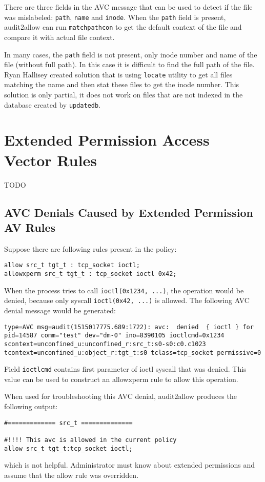 There are three fields in the AVC message that can be used to detect if the file
was mislabeled: \texttt{path}, \texttt{name} and \texttt{inode}. When the
\texttt{path} field is present, audit2allow can run \texttt{matchpathcon} to get
the default context of the file and compare it with actual file context.

In many cases, the \texttt{path} field is not present, only inode number and
name of the file (without full path). In this case it is difficult to find the
full path of the file. Ryan Hallisey created solution \cite{restoreconpullreq}
that is using \texttt{locate} utility to get all files matching the name and
then stat these files to get the inode number. This solution is only partial, it
does not work on files that are not indexed in the database created by
\texttt{updatedb}.

\section{Extended Permission Access Vector Rules}
TODO

\subsection{AVC Denials Caused by Extended Permission AV Rules}
Suppose there are following rules present in the policy:
\begin{lstlisting}
allow src_t tgt_t : tcp_socket ioctl;
allowxperm src_t tgt_t : tcp_socket ioctl 0x42;
\end{lstlisting}
When the process tries to call \texttt{ioctl(0x1234, ...)}, the operation would
be denied, because only syscall \texttt{ioctl(0x42, ...)} is allowed. The
following AVC denial message would be generated:
\begin{lstlisting}
type=AVC msg=audit(1515017775.689:1722): avc:  denied  { ioctl } for
pid=14587 comm="test" dev="dm-0" ino=8390105 ioctlcmd=0x1234
scontext=unconfined_u:unconfined_r:src_t:s0-s0:c0.c1023
tcontext=unconfined_u:object_r:tgt_t:s0 tclass=tcp_socket permissive=0
\end{lstlisting}
Field \texttt{ioctlcmd} contains first parameter of ioctl syscall that was
denied. This value can be used to construct an allowxperm rule to allow this
operation.

When used for troubleshooting this AVC denial, audit2allow produces the
following output:
\begin{lstlisting}
#============= src_t ==============

#!!!! This avc is allowed in the current policy
allow src_t tgt_t:tcp_socket ioctl;
\end{lstlisting}
which is not helpful. Administrator must know about extended permissions and
assume that the allow rule was overridden.

